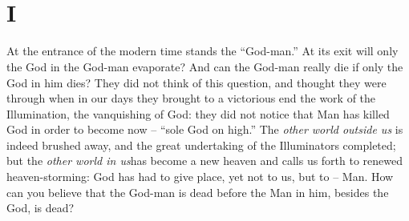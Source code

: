 
\chapter[Part Second: I]{\\
I}

\medskip{}

\noindent{}At the entrance of the modern time stands the ``God-man.'' At its 
exit will only the God in the God-man evaporate? And can the God-man really 
die if only the God in him dies? They did not think of this question, and 
thought they were through when in our days they brought to a victorious end 
the work of the Illumination, the vanquishing of God: they did not notice that 
Man has killed God in order to become now -- ``sole God on high.'' The 
\textit{other world outside us} is indeed brushed away, and the great 
undertaking of the Illuminators completed; but the \textit{other world in 
us}has become a new heaven and calls us forth to renewed heaven-storming: God 
has had to give place, yet not to us, but to -- Man. How can you believe that 
the God-man is dead before the Man in him, besides the God, is dead?

\medskip{}
